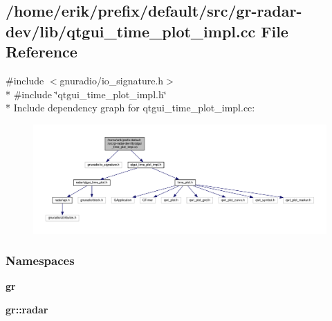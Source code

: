 \subsection{/home/erik/prefix/default/src/gr-\/radar-\/dev/lib/qtgui\+\_\+time\+\_\+plot\+\_\+impl.cc File Reference}
\label{qtgui__time__plot__impl_8cc}
{\ttfamily \#include $<$gnuradio/io\+\_\+signature.\+h$>$}\\*
{\ttfamily \#include \char`\"{}qtgui\+\_\+time\+\_\+plot\+\_\+impl.\+h\char`\"{}}\\*
Include dependency graph for qtgui\+\_\+time\+\_\+plot\+\_\+impl.\+cc\+:
\nopagebreak
\begin{figure}[H]
\begin{center}
\leavevmode
\includegraphics[width=350pt]{de/d10/qtgui__time__plot__impl_8cc__incl}
\end{center}
\end{figure}
\subsubsection*{Namespaces}
\begin{DoxyCompactItemize}
\item 
 {\bf gr}
\item 
 {\bf gr\+::radar}
\end{DoxyCompactItemize}
